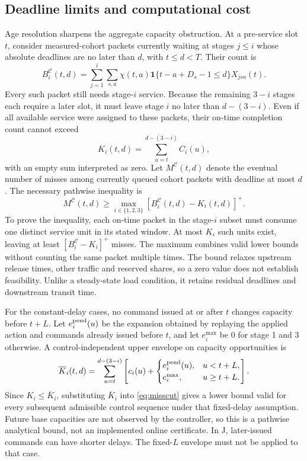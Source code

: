 \documentclass{IEEEoj}
\begin{document}
\subsection{Deadline limits and computational cost}
Age resolution sharpens the aggregate capacity obstruction. At a pre-service
slot $t$, consider measured-cohort packets currently waiting at stages
$j\le i$ whose absolute deadlines are no later than $d$, with $t\le d<T$.
Their count is
\begin{equation}
 B_i^{\mathcal C}(t,d)=
 \sum_{j=1}^{i}\sum_{s,a}
 \chi(t,a)\mathbf1\{t-a+D_s-1\le d\}X_{jsa}(t).
 \label{eq:deadlinedemand}
\end{equation}
Every such packet still needs stage-$i$ service. Because the remaining
$3-i$ stages each require a later slot, it must leave stage $i$ no later
than $d-(3-i)$. Even if all available service were assigned to these packets,
their on-time completion count cannot exceed
\begin{equation}
 K_i(t,d)=\sum_{u=t}^{d-(3-i)}C_i(u),
 \label{eq:deadlinecapacity}
\end{equation}
with an empty sum interpreted as zero. Let $M^{\mathcal C}(t,d)$ denote the
eventual number of misses among currently queued cohort packets with deadline
at most $d$. The necessary pathwise inequality is
\begin{equation}
 M^{\mathcal C}(t,d)\ge
 \max_{i\in\{1,2,3\}}[B_i^{\mathcal C}(t,d)-K_i(t,d)]^+.
 \label{eq:misscut}
\end{equation}
To prove the inequality, each on-time packet in the stage-$i$ subset must
consume one distinct service unit in its stated window. At most $K_i$ such
units exist, leaving at least $[B_i^{\mathcal C}-K_i]^+$ misses. The maximum
combines valid lower bounds without counting the same packet multiple times.
The bound relaxes upstream release times, other traffic and reserved shares,
so a zero value does not establish feasibility. Unlike a steady-state load
condition, it retains residual deadlines and downstream transit time.

For the constant-delay cases, no command issued at or after $t$ changes
capacity before $t+L$. Let $e_i^{\rm pend}(u)$ be the expansion obtained by
replaying the applied action and commands already issued before $t$, and let
$e_i^{\max}$ be $0$ for stage 1 and $3$ otherwise. A control-independent upper
envelope on capacity opportunities is
\begin{equation}
 \overline K_i(t,d)=\sum_{u=t}^{d-(3-i)}
 \left[c_i(u)+
 \begin{cases}
 e_i^{\rm pend}(u),&u<t+L,\\
 e_i^{\max},&u\ge t+L.
 \end{cases}\right].
 \label{eq:delaycut}
\end{equation}
Since $K_i\le\overline K_i$, substituting $\overline K_i$ into
\eqref{eq:misscut} gives a lower bound valid for every subsequent admissible
control sequence under that fixed-delay assumption. Future base capacities
are not observed by the controller, so this is a pathwise analytical bound,
not an implemented online certificate. In J, later-issued commands can have
shorter delays. The fixed-$L$ envelope must not be applied to that case.
\end{document}

